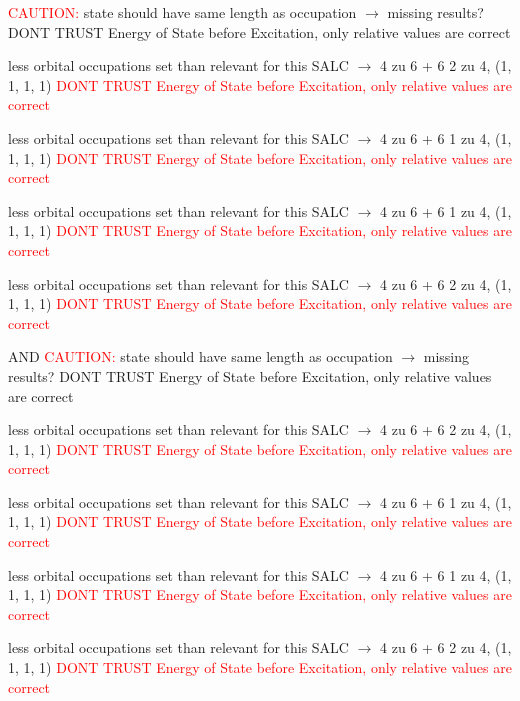 \documentclass[12pt,a4paper]{article}
\begin{document}
	\textcolor{red}{CAUTION:} state should have same length as occupation $\rightarrow$ missing results?
	DONT TRUST \glqq{}Energy of State before Excitation\grqq{}, only relative values are correct

less orbital occupations set than relevant for this SALC $\rightarrow$ 
4 zu 6 + 6 
2 zu 4, (1, 1, 1, 1) 
\textcolor{red}{DONT TRUST \glqq{}Energy of State before Excitation\grqq{}, only relative values are correct}

less orbital occupations set than relevant for this SALC $\rightarrow$ 
4 zu 6 + 6 
1 zu 4, (1, 1, 1, 1) 
\textcolor{red}{DONT TRUST \glqq{}Energy of State before Excitation\grqq{}, only relative values are correct}

less orbital occupations set than relevant for this SALC $\rightarrow$ 
4 zu 6 + 6 
1 zu 4, (1, 1, 1, 1) 
\textcolor{red}{DONT TRUST \glqq{}Energy of State before Excitation\grqq{}, only relative values are correct}

less orbital occupations set than relevant for this SALC $\rightarrow$ 
4 zu 6 + 6 
2 zu 4, (1, 1, 1, 1) 
\textcolor{red}{DONT TRUST \glqq{}Energy of State before Excitation\grqq{}, only relative values are correct}

 AND 	\textcolor{red}{CAUTION:} state should have same length as occupation $\rightarrow$ missing results?
	DONT TRUST \glqq{}Energy of State before Excitation\grqq{}, only relative values are correct

less orbital occupations set than relevant for this SALC $\rightarrow$ 
4 zu 6 + 6 
2 zu 4, (1, 1, 1, 1) 
\textcolor{red}{DONT TRUST \glqq{}Energy of State before Excitation\grqq{}, only relative values are correct}

less orbital occupations set than relevant for this SALC $\rightarrow$ 
4 zu 6 + 6 
1 zu 4, (1, 1, 1, 1) 
\textcolor{red}{DONT TRUST \glqq{}Energy of State before Excitation\grqq{}, only relative values are correct}

less orbital occupations set than relevant for this SALC $\rightarrow$ 
4 zu 6 + 6 
1 zu 4, (1, 1, 1, 1) 
\textcolor{red}{DONT TRUST \glqq{}Energy of State before Excitation\grqq{}, only relative values are correct}

less orbital occupations set than relevant for this SALC $\rightarrow$ 
4 zu 6 + 6 
2 zu 4, (1, 1, 1, 1) 
\textcolor{red}{DONT TRUST \glqq{}Energy of State before Excitation\grqq{}, only relative values are correct}
\end{document}
